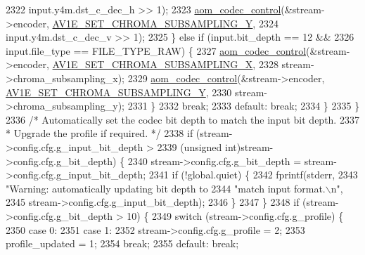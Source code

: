 \begin{DoxyCodeInclude}
{{{{{{{{{{{{{{{{{{{{{{{{{{{{{{{{{{{{{{{{{{{{{{{{{{{{{{{{{{{{{{2322                 input.y4m.dst\_c\_dec\_h >> 1);
2323             \hyperlink{group__codec_ga6da974f4eeaba1fa74106b28d0fe6ac5}{aom\_codec\_control}(&stream->encoder, 
      \hyperlink{group__aom__encoder_ggae78dde67a6d78f332e9bdba0dde42db5a501a9453d5790f32c001e9877d3db40c}{AV1E\_SET\_CHROMA\_SUBSAMPLING\_Y},
2324                 input.y4m.dst\_c\_dec\_v >> 1);
2325           \} \textcolor{keywordflow}{else} \textcolor{keywordflow}{if} (input.bit\_depth == 12 &&
2326               input.file\_type == FILE\_TYPE\_RAW) \{
2327             \hyperlink{group__codec_ga6da974f4eeaba1fa74106b28d0fe6ac5}{aom\_codec\_control}(&stream->encoder, 
      \hyperlink{group__aom__encoder_ggae78dde67a6d78f332e9bdba0dde42db5a283dd3f4387e5f3a754fea0d206b1cb0}{AV1E\_SET\_CHROMA\_SUBSAMPLING\_X},
2328                 stream->chroma\_subsampling\_x);
2329             \hyperlink{group__codec_ga6da974f4eeaba1fa74106b28d0fe6ac5}{aom\_codec\_control}(&stream->encoder, 
      \hyperlink{group__aom__encoder_ggae78dde67a6d78f332e9bdba0dde42db5a501a9453d5790f32c001e9877d3db40c}{AV1E\_SET\_CHROMA\_SUBSAMPLING\_Y},
2330                 stream->chroma\_subsampling\_y);
2331           \}
2332           \textcolor{keywordflow}{break};
2333         \textcolor{keywordflow}{default}: \textcolor{keywordflow}{break};
2334         \}
2335       \}
2336       \textcolor{comment}{/* Automatically set the codec bit depth to match the input bit depth.}
2337 \textcolor{comment}{       * Upgrade the profile if required. */}
2338       \textcolor{keywordflow}{if} (stream->config.cfg.g\_input\_bit\_depth >
2339           (\textcolor{keywordtype}{unsigned} \textcolor{keywordtype}{int})stream->config.cfg.g\_bit\_depth) \{
2340         stream->config.cfg.g\_bit\_depth = stream->config.cfg.g\_input\_bit\_depth;
2341         \textcolor{keywordflow}{if} (!global.quiet) \{
2342           fprintf(stderr,
2343               \textcolor{stringliteral}{"Warning: automatically updating bit depth to %
2344               \textcolor{stringliteral}{"match input format.\(\backslash\)n"},
2345               stream->config.cfg.g\_input\_bit\_depth);
2346         \}
2347       \}
2348       \textcolor{keywordflow}{if} (stream->config.cfg.g\_bit\_depth > 10) \{
2349         \textcolor{keywordflow}{switch} (stream->config.cfg.g\_profile) \{
2350         \textcolor{keywordflow}{case} 0:
2351         \textcolor{keywordflow}{case} 1:
2352           stream->config.cfg.g\_profile = 2;
2353           profile\_updated = 1;
2354           \textcolor{keywordflow}{break};
2355         \textcolor{keywordflow}{default}: \textcolor{keywordflow}{break};
}}}}}}}}}}}}}}}}}}}}}}}}}}}}}}}}}}}}}}}}}}}}}}}}}}}}}}}}}}}}}}}
\end{DoxyCodeInclude}
